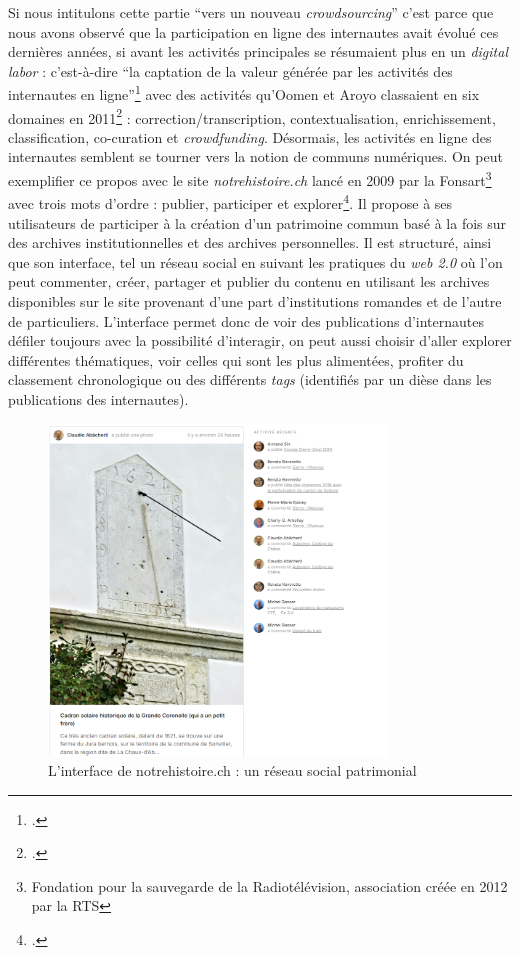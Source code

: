 Si nous intitulons cette partie \enquote{vers un nouveau \textit{crowdsourcing}} c’est parce que nous avons observé que la participation en ligne des internautes avait évolué ces dernières années, si avant les activités principales se résumaient plus en un \textit{digital labor} : c’est-à-dire \enquote{la captation de la valeur générée par les activités des internautes en ligne}\footcite{zotero-365} avec des activités qu’Oomen et Aroyo classaient en six domaines en 2011\footcite[(cité par)]{neroulidis_crowdsourcing_2015} : correction/transcription, contextualisation, enrichissement, classification, co-curation et \textit{crowdfunding}. Désormais, les activités en ligne des internautes semblent se tourner vers la notion de communs numériques. On peut exemplifier ce propos avec le site \textit{notrehistoire.ch} lancé en 2009 par la Fonsart\footnote{Fondation pour la sauvegarde de la Radiotélévision, association créée en 2012 par la RTS} avec trois mots d’ordre : publier, participer et explorer\footcite{zotero-361}. Il propose à ses utilisateurs de participer à la création d’un patrimoine commun basé à la fois sur des archives institutionnelles et des archives personnelles. Il est structuré, ainsi que son interface, tel un réseau social en suivant les pratiques du \textit{web 2.0} où l’on peut commenter, créer, partager et publier du contenu en utilisant les archives disponibles sur le site provenant d’une part d’institutions romandes et de l’autre de particuliers. L'interface permet donc de voir des publications d’internautes défiler toujours avec la possibilité d’interagir, on peut aussi choisir d’aller explorer différentes thématiques, voir celles qui sont les plus alimentées, profiter du classement chronologique ou des différents \textit{tags} (identifiés par un dièse dans les publications des internautes).



\begin{figure}[h!]
	\centering
	\includegraphics[width=0.8\textwidth]{images/image22.png}
	\caption{L'interface de notrehistoire.ch : un réseau social patrimonial}
	\label{fig:image21}
\end{figure}

